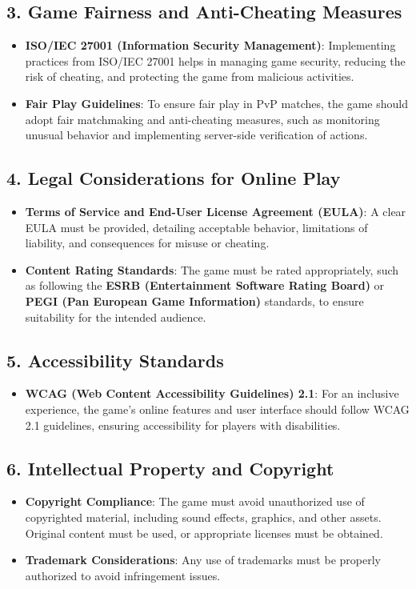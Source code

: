 \subsection*{3. Game Fairness and Anti-Cheating Measures}
\begin{itemize}
    \item \textbf{ISO/IEC 27001 (Information Security Management)}: Implementing practices from ISO/IEC 27001 helps in managing game security, reducing the risk of cheating, and protecting the game from malicious activities.
    \item \textbf{Fair Play Guidelines}: To ensure fair play in PvP matches, the game should adopt fair matchmaking and anti-cheating measures, such as monitoring unusual behavior and implementing server-side verification of actions.
\end{itemize}

\subsection*{4. Legal Considerations for Online Play}
\begin{itemize}
    \item \textbf{Terms of Service and End-User License Agreement (EULA)}: A clear EULA must be provided, detailing acceptable behavior, limitations of liability, and consequences for misuse or cheating.
    \item \textbf{Content Rating Standards}: The game must be rated appropriately, such as following the \textbf{ESRB (Entertainment Software Rating Board)} or \textbf{PEGI (Pan European Game Information)} standards, to ensure suitability for the intended audience.
\end{itemize}

\subsection*{5. Accessibility Standards}
\begin{itemize}
    \item \textbf{WCAG (Web Content Accessibility Guidelines) 2.1}: For an inclusive experience, the game’s online features and user interface should follow WCAG 2.1 guidelines, ensuring accessibility for players with disabilities.
\end{itemize}

\subsection*{6. Intellectual Property and Copyright}
\begin{itemize}
    \item \textbf{Copyright Compliance}: The game must avoid unauthorized use of copyrighted material, including sound effects, graphics, and other assets. Original content must be used, or appropriate licenses must be obtained.
    \item \textbf{Trademark Considerations}: Any use of trademarks must be properly authorized to avoid infringement issues.
\end{itemize}

